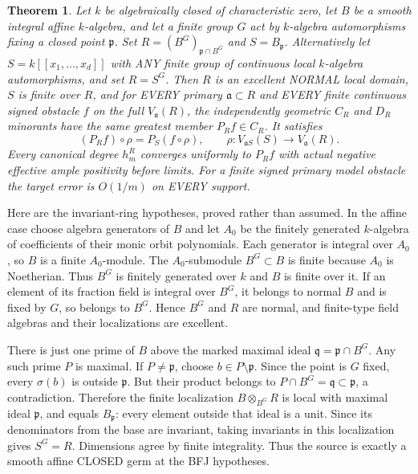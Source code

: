 \documentclass[11pt]{article}
\newtheorem{theorem}{Theorem}
\begin{document}
\begin{theorem}
Let $k$ be algebraically closed of characteristic zero, let $B$ be a smooth
integral affine $k$-algebra, and let a finite group $G$ act by $k$-algebra
automorphisms fixing a closed point $\mathfrak p$. Set
$R=(B^G)_{\mathfrak p\cap B^G}$ and $S=B_{\mathfrak p}$.
Alternatively let $S=k[[x_1,\ldots,x_d]]$ with ANY finite group of continuous
local $k$-algebra automorphisms, and set $R=S^G$.
Then $R$ is an excellent NORMAL local domain, $S$ is finite over $R$, and
for EVERY primary $\mathfrak a\subset R$ and EVERY finite continuous signed
obstacle $f$ on the full $V_{\mathfrak a}(R)$, the independently geometric
$C_R$ and $D_R$ minorants have the same greatest member $P_R f\in C_R$.
It satisfies
\[
 (P_R f)\circ\rho=P_S(f\circ\rho),\qquad
 \rho:V_{\mathfrak aS}(S)\longrightarrow V_{\mathfrak a}(R).
\]
Every canonical degree $h_m^R$ converges uniformly to $P_R f$ with actual
negative effective ample positivity before limits. For a finite signed
primary model obstacle the target error is $O(1/m)$ on EVERY support.
\end{theorem}

Here are the invariant-ring hypotheses, proved rather than assumed.
In the affine case choose algebra generators of $B$ and let $A_0$ be the
finitely generated $k$-algebra of coefficients of their monic orbit
polynomials. Each generator is integral over $A_0$, so $B$ is a finite
$A_0$-module. The $A_0$-submodule $B^G\subset B$ is finite because $A_0$
is Noetherian. Thus $B^G$ is finitely generated over $k$ and $B$ is finite
over it. If an element of its fraction field is integral over $B^G$, it
belongs to normal $B$ and is fixed by $G$, so belongs to $B^G$. Hence
$B^G$ and $R$ are normal, and finite-type field algebras and their
localizations are excellent.

There is just one prime of $B$ above the marked maximal ideal
$\mathfrak q=\mathfrak p\cap B^G$. Any such prime $P$ is maximal. If
$P\ne\mathfrak p$, choose $b\in P\setminus\mathfrak p$. Since the point
is $G$ fixed, every $\sigma(b)$ is outside $\mathfrak p$. But their
product belongs to $P\cap B^G=\mathfrak q\subset\mathfrak p$, a
contradiction. Therefore the finite localization $B\otimes_{B^G}R$
is local with maximal ideal $\mathfrak p$, and equals $B_{\mathfrak p}$:
every element outside that ideal is a unit. Since its denominators from
the base are invariant, taking invariants in this localization gives
$S^G=R$. Dimensions agree by finite integrality. Thus the source is
exactly a smooth affine CLOSED germ at the BFJ hypotheses.
\end{document}
